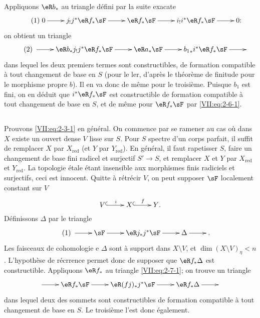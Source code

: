 Appliquons $\eR b_\ast$ au triangle défini par la suite exacate 
\begin{equation*}\tag{1}\label{VII:eq:2-6-1}
\xymatrix{
  0 \ar[r] 
    & j_! j^\ast \eR f_\ast \sF \ar[r] 
    & \eR f_\ast \sF \ar[r] 
    & i_! i^\ast \eR f_\ast \sF \ar[r] 
    & 0 \text{:} 
}
\end{equation*}
on obtient un triangle 
\begin{equation*}\tag{2}\label{VII:eq:2-6-2}
\xymatrix{
  \ar[r] 
    & \eR b_\ast j_! j^\ast \eR f_\ast \sF \ar[r] 
    & \eR a_\ast \sF \ar[r] 
    & {b_1}_\ast i^\ast \eR f_\ast \sF \ar[r] 
    & 
}
\end{equation*}
dans lequel les deux premiers termes sont constructibles, de formation 
compatible à tout changement de base en $S$ (pour le ler, d'après le 
théorème de finitude pour le morphisme propre $b$). Il en va donc de 
même pour le troisième. Puisque $b_1$ est fini, on en déduit que 
$i^\ast \eR f_\ast \sF$ est constructible de formation compatible à tout 
changement de base en $S$, et de même pour $\eR f_\ast \sF$ par 
\eqref{VII:eq:2-6-1}. 





\subsection{}\label{VII:2-7}

Prouvons \eqref{VII:eq:2-3-1} en général. On commence par se ramener au cas 
où dans $X$ existe un ouvert dense $V$ lisse sur $S$. Pour $S$ spectre d'un 
corps parfait, il suffit de remplacer $X$ par $X_\text{red}$ (et $Y$ par 
$Y_\text{red}$). En général, il faut rapetisser $S$, faire un changement de 
base fini radicel et surjectif $S' \to S$, et remplacer $X$ et $Y$ par 
$X_\text{red}$ et $Y_\text{red}$. La topologie étale étant insensible aux 
morphismes finis radiciels et surjectifs, ceci est innocent. Quitte à 
rétrécir $V$, on peut supposer $\sF$ localement constant sur $V$ 
\[\xymatrix{
  V \ar@{^{(}->}[r]^i 
    & X \ar@{^{(}->}[r]^-f 
    & Y \text{.} 
}\]
Définissons $\Delta$ par le triangle 
\begin{equation*}\tag{1}\label{VII:eq:2-7-1}
\xymatrix{
  \ar[r] 
    & \sF \ar[r] 
    & \eR j_\ast j^\ast \sF \ar[r] 
    & \Delta \ar[r] 
    & \text{.} 
}
\end{equation*}
Les faisceaux de cohomologie e $\Delta$ sont à support dans $X\setminus V$, 
et $\dim(X\setminus V)_\eta < n$. L'hypothèse de récrrence permet donc de 
supposer que $\eR f_\ast \Delta$ est constructible. Appliquons $\eR f_\ast$ au 
triangle \eqref{VII:eq:2-7-1}; on trouve un triangle 
\[\xymatrix{
  \ar[r] 
    & \eR f_\ast \sF \ar[r] 
    & \eR(f j)_\ast j^\ast \sF \ar[r] 
    & \eR f_\ast \Delta \ar[r] 
    & 
}\]
dans lequel deux des sommets sont constructibles de formation compatible à 
tout changement de base en $S$. Le troisième l'est donc également. 





